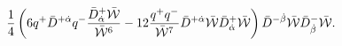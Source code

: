 \begin{equation}\label{comp_part}
{1 \over 4}\left(
6q^{+}\bar{D}^{+\dot{\alpha}}q^{-} {\bar{D}^{+}_{\dot\alpha}\bar{\cal W}\over \bar{\cal W}^6}
- 12{q^{+}q^{-}\over \bar{\cal W}^7}\bar{D}^{+ \dot\alpha}\bar{\cal W}
\bar{D}^{+}_{\dot\alpha}\bar{\cal W}
\right)\bar{D}^{-\dot\beta}\bar{\cal W}\bar{D}^{-}_{\dot\beta}\bar{\cal
W}.
\end{equation}

